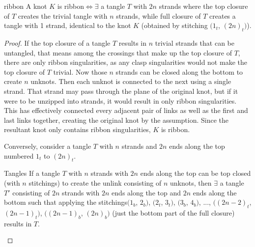 \begin{paper}
\begin{papertheorem}{ribbon}
A knot $K$ is ribbon$\iff\exists$ a tangle $T$ with $2n$ strands where the
top closure of $T$ creates the trivial tangle with $n$ strands, while
full closure of $T$ creates a tangle with 1 strand, identical to the knot $K$
(obtained by stitching $(1_t$, $(2n)_t)$).
\end{papertheorem}
\begin{proof}
If the top closure of a tangle $T$ results in $n$ trivial strands that can be
untangled, that means among the crossings that make up the top closure of $T$,
there are only ribbon singularities, as any clasp singularities would not make
the top closure of $T$ trivial.
Now those $n$ strands can be closed along the bottom to create $n$ unknots.
Then each unknot is connected to the next using a single strand.
That strand may pass through the plane of the original knot, but if it were to
be unzipped into strands, it would result in only ribbon singularities.
This has effectively connected every adjacent pair of links as well as the first
and last links together, creating the original knot by the assumption.
Since the resultant knot only contains ribbon singularities, $K$ is ribbon.

Conversely, consider a tangle $T$ with $n$ strands and $2n$ ends along the top
numbered $1_t$ to $(2n)_t$.
\begin{paperlemma}{Tangles}
If a tangle $T$ with $n$ strands with $2n$ ends along the top can be top closed
(with $n$ stitchings) to create the unlink consisting of $n$ unknots, then
$\exists$ a tangle $T'$ consisting of $2n$ strands with $2n$ ends along the top
and $2n$ ends along the bottom such that applying the stitchings$(1_b$, $2_b)$,
$(2_t$, $3_t)$, $(3_b$, $4_b)$, $...$, $((2n-2)_t$, $(2n-1)_t)$, $((2n-1)_b$,
$(2n)_b)$ (just the bottom part of the full closure) results in $T$.


\end{paperlemma}
\end{proof}
\end{paper}
